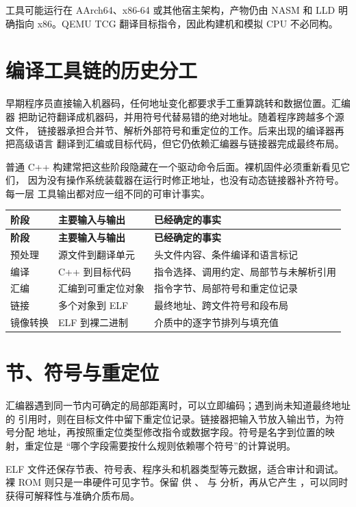 工具可能运行在 AArch64、x86-64 或其他宿主架构，产物仍由 NASM 和 LLD
明确指向 x86。QEMU TCG 翻译目标指令，因此构建机和模拟 CPU 不必同构。

\section{编译工具链的历史分工}

早期程序员直接输入机器码，任何地址变化都要求手工重算跳转和数据位置。汇编器
把助记符翻译成机器码，并用符号代替易错的绝对地址。随着程序跨越多个源文件，
链接器承担合并节、解析外部符号和重定位的工作。后来出现的编译器再把高级语言
翻译到汇编或目标代码，但它仍依赖汇编器与链接器完成最终布局。

普通 C++ 构建常把这些阶段隐藏在一个驱动命令后面。裸机固件必须重新看见它们，
因为没有操作系统装载器在运行时修正地址，也没有动态链接器补齐符号。每一层
工具输出都对应一组不同的可审计事实。

\begin{longtable}{L{0.16\textwidth}L{0.24\textwidth}L{0.42\textwidth}}
\toprule
\textbf{阶段} & \textbf{主要输入与输出} & \textbf{已经确定的事实}\\
\midrule
\endfirsthead
\toprule
\textbf{阶段} & \textbf{主要输入与输出} & \textbf{已经确定的事实}\\
\midrule
\endhead
预处理 & 源文件到翻译单元 & 头文件内容、条件编译和语言标记\\
编译 & C++ 到目标代码 & 指令选择、调用约定、局部节与未解析引用\\
汇编 & 汇编到可重定位对象 & 指令字节、局部符号和重定位记录\\
链接 & 多个对象到 ELF & 最终地址、跨文件符号和段布局\\
镜像转换 & ELF 到裸二进制 & 介质中的逐字节排列与填充值\\
\bottomrule
\end{longtable}

\section{节、符号与重定位}

汇编器遇到同一节内可确定的局部距离时，可以立即编码；遇到尚未知道最终地址的
引用时，则在目标文件中留下重定位记录。链接器把输入节放入输出节，为符号分配
地址，再按照重定位类型修改指令或数据字段。符号是名字到位置的映射，重定位是
“哪个字段需要按什么规则依赖哪个符号”的计算说明。

ELF 文件还保存节表、符号表、程序头和机器类型等元数据，适合审计和调试。
裸 ROM 则只是一串硬件可见字节。保留  供
、 与  分析，再从它产生
，可以同时获得可解释性与准确介质布局。

